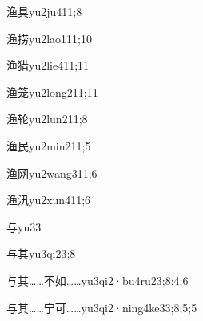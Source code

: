 \begin{verbete}{渔具}{yu2ju4}{11;8}
\end{verbete}

\begin{verbete}{渔捞}{yu2lao1}{11;10}
\end{verbete}

\begin{verbete}{渔猎}{yu2lie4}{11;11}
\end{verbete}

\begin{verbete}{渔笼}{yu2long2}{11;11}
\end{verbete}

\begin{verbete}{渔轮}{yu2lun2}{11;8}
\end{verbete}

\begin{verbete}{渔民}{yu2min2}{11;5}
\end{verbete}

\begin{verbete}{渔网}{yu2wang3}{11;6}
\end{verbete}

\begin{verbete}{渔汛}{yu2xun4}{11;6}
\end{verbete}

\begin{verbete}{与}{yu3}{3}
\end{verbete}

\begin{verbete}{与其}{yu3qi2}{3;8}
\end{verbete}

\begin{verbete}{与其……不如……}{yu3qi2·bu4ru2}{3;8;4;6}
\end{verbete}

\begin{verbete}{与其……宁可……}{yu3qi2·ning4ke3}{3;8;5;5}
\end{verbete}

